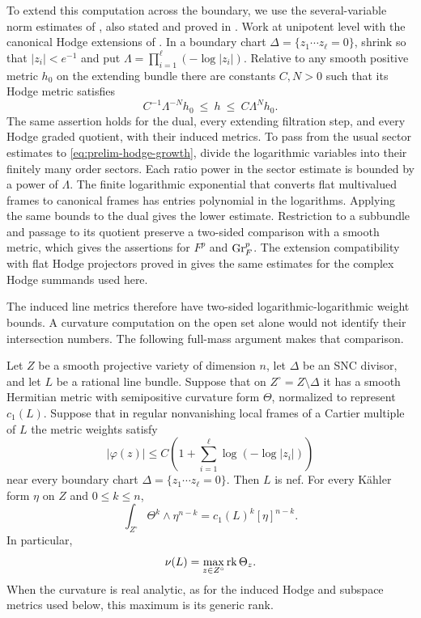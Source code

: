 To extend this computation across the boundary, we use the
several-variable norm estimates of \cite[Theorem 5.21]{CKS}, also stated
and proved in \cite[Theorem 5.1]{CK}.  Work at unipotent level with the
canonical Hodge extensions of .  In a boundary
chart $\Delta=\{z_1\cdots z_\ell=0\}$, shrink so that $|z_i|<e^{-1}$
and put $\Lambda=\prod_{i=1}^{\ell}(-\log|z_i|)$.  Relative to any
smooth positive metric $h_0$ on the extending bundle there are constants
$C,N>0$ such that its Hodge metric satisfies
\begin{equation}\label{eq:prelim-hodge-growth}
 C^{-1}\Lambda^{-N}h_0\ \leq\ h\ \leq\ C\Lambda^N h_0.
\end{equation}
The same assertion holds for the dual, every extending filtration step,
and every Hodge graded quotient, with their induced metrics.  To pass
from the usual sector estimates to \eqref{eq:prelim-hodge-growth}, divide
the logarithmic variables into their finitely many order sectors.  Each
ratio power in the sector estimate is bounded by a power of $\Lambda$.
The finite logarithmic exponential that converts flat multivalued frames
to canonical frames has entries polynomial in the logarithms.  Applying
the same bounds to the dual gives the lower estimate.  Restriction to a
subbundle and passage to its quotient preserve a two-sided comparison
with a smooth metric, which gives the assertions for $F^p$ and $\operatorname{Gr}_F^p$.
The extension compatibility with flat Hodge projectors proved in
 gives the same estimates for the complex Hodge
summands used here.

The induced line metrics therefore have two-sided logarithmic-logarithmic
weight bounds.  A curvature computation on the open set alone would not
identify their intersection numbers.  The following full-mass argument
makes that comparison.


\begin{lemma}\label{lem:log-metric}
Let $Z$ be a smooth projective variety of dimension $n$, let $\Delta$ be
an SNC divisor, and let $L$ be a rational line bundle.  Suppose that on
$Z^\circ=Z\setminus\Delta$ it has a smooth Hermitian metric with
semipositive curvature form $\Theta$, normalized to represent $c_1(L)$.
Suppose that in regular nonvanishing local frames of a Cartier multiple
of $L$ the metric weights satisfy
\begin{equation}\label{eq:prelim-loglog-bound}
 |\varphi(z)|\leq C\left(1+
       \sum_{i=1}^{\ell}\log(-\log|z_i|)\right)
\end{equation}
near every boundary chart $\Delta=\{z_1\cdots z_\ell=0\}$.
Then $L$ is nef.  For every Kähler form $\eta$ on $Z$ and
$0\leq k\leq n$,
\begin{equation}\label{eq:prelim-mass-identity}
 \int_{Z^\circ}\Theta^k\wedge\eta^{n-k}
       =c_1(L)^k[\eta]^{n-k}.
\end{equation}
In particular,
\begin{equation}\label{eq:prelim-curvature-rank}
 \nu(L)=\max_{z\in Z^\circ}\operatorname{rk}\Theta_z.
\end{equation}
When the curvature is real analytic, as for the induced Hodge and
subspace metrics used below, this maximum is its generic rank.
\end{lemma}

